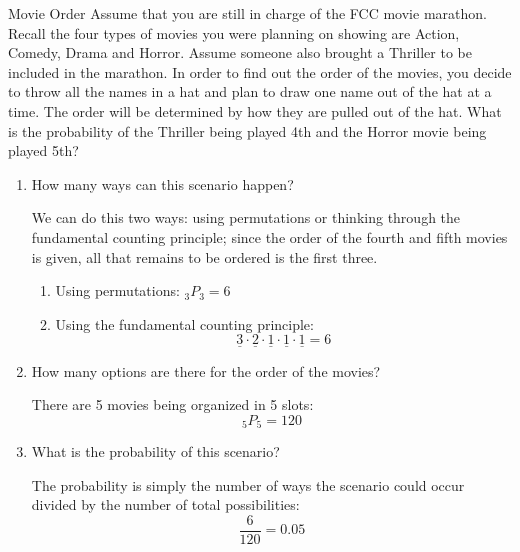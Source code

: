 \begin{example}[https://www.youtube.com/watch?v=vG46K6Fr8Yw]{Movie Order}
Assume that you are still in charge of the FCC movie marathon. Recall the
four types of movies you were planning on showing are Action, Comedy, Drama and Horror.
Assume someone also brought a Thriller to be included in the marathon. In order to find
out the order of the movies, you decide to throw all the names in a hat and plan to draw one
name out of the hat at a time. The order will be determined by how they are pulled out of
the hat. What is the probability of the Thriller being played 4th and the Horror movie being
played 5th?\\

\sol
\begin{enumerate}
\item How many ways can this scenario happen?

We can do this two ways: using permutations or thinking through the fundamental counting principle; since the order of the fourth and fifth movies is given, all that remains to be ordered is the first three.
\begin{enumerate}
\item Using permutations: $_3P_3 = 6$
\item Using the fundamental counting principle:
\[\underline{3} \cdot \underline{2} \cdot \underline{1} \cdot \underline{1} \cdot \underline{1} = 6\]
\end{enumerate}

\item How many options are there for the order of the movies?

There are 5 movies being organized in 5 slots: \[_5P_5 = 120\]

\item What is the probability of this scenario?

The probability is simply the number of ways the scenario could occur divided by the number of total possibilities:
\[\dfrac{6}{120} = 0.05\]
\end{enumerate}
\end{example}

